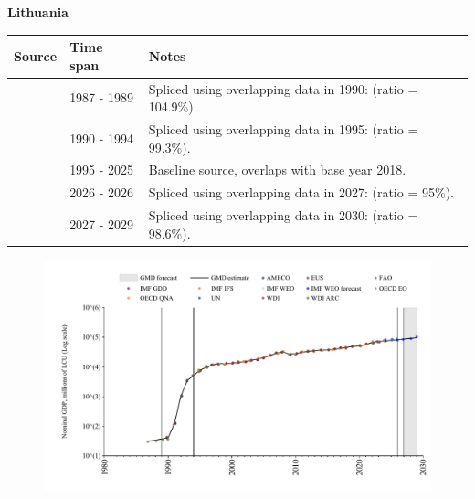 \documentclass[12pt,a4paper,landscape]{article}
\begin{document}
\begin{adjustbox}{max totalsize={\paperwidth}{\paperheight},center}
\begin{minipage}[t][\textheight][t]{\textwidth}
\vspace*{0.5cm}
{}
\begin{center}
{\Large\bfseries Lithuania}
\end{center}
\vspace{0.5cm}
\begin{table}[H]
\centering
\small
\begin{tabular}{|l|l|l|}
\hline
\textbf{Source} & \textbf{Time span} & \textbf{Notes} \\
\hline
\rowcolor{white}\cite{WDI_ARC}& 1987 - 1989 &Spliced using overlapping data in 1990: (ratio = 104.9\%).\\
\rowcolor{lightgray}\cite{AMECO}& 1990 - 1994 &Spliced using overlapping data in 1995: (ratio = 99.3\%).\\
\rowcolor{white}\cite{OECD_EO}& 1995 - 2025 &Baseline source, overlaps with base year 2018.\\
\rowcolor{lightgray}\cite{AMECO}& 2026 - 2026 &Spliced using overlapping data in 2027: (ratio = 95\%).\\
\rowcolor{white}\cite{IMF_WEO_forecast}& 2027 - 2029 &Spliced using overlapping data in 2030: (ratio = 98.6\%).\\
\hline
\end{tabular}
\end{table}
\begin{figure}[H]
\centering
\includegraphics[width=\textwidth,height=0.6\textheight,keepaspectratio]{graphs/LTU_nGDP.pdf}
\end{figure}
\end{minipage}
\end{adjustbox}
\end{document}
